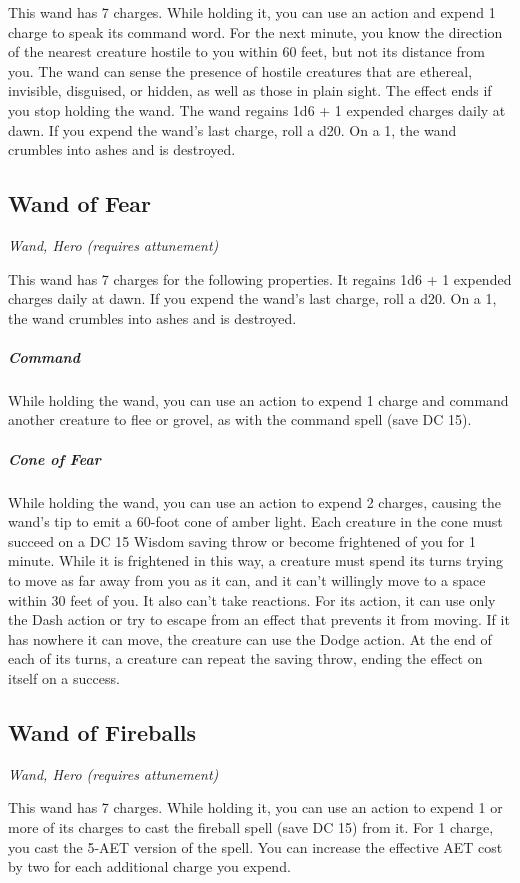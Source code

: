 This wand has 7 charges. While holding it, you can use an action and expend 1 charge to speak its command word. For the next minute, you know the direction of the nearest creature hostile to you within 60 feet,
but not its distance from you. The wand can sense the presence of hostile creatures that are ethereal, invisible, disguised, or hidden, as well as those in plain sight. The effect ends if you stop holding the wand.
The wand regains 1d6 + 1 expended charges daily at dawn. If you expend the wand's last charge, roll a d20. On a 1, the wand crumbles into ashes and is destroyed.

\subsection{Wand of Fear}
\textit{Wand, Hero (requires attunement)}

This wand has 7 charges for the following properties. It regains 1d6 + 1 expended charges daily at dawn. If you expend the wand's last charge, roll a d20. On a 1, the wand crumbles into ashes and is destroyed.

\subparagraph*{Command} While holding the wand, you can use an action to expend 1 charge and command another creature to flee or grovel, as with the command spell (save DC 15).

\subparagraph*{Cone of Fear} While holding the wand, you can use an action to expend 2 charges, causing the wand's tip to emit a 60-foot cone of amber light. Each creature in the cone must succeed on a DC 15 Wisdom saving throw or become frightened of you for 1 minute. While it is frightened in this way, a creature must spend its turns trying to move as far away from you as it can, and it can't willingly move to a space within 30 feet of you. It also can't take reactions. For its action, it can use only the Dash action or try to escape from an effect that prevents it from moving. If it has nowhere it can move, the creature can use the Dodge action. At the end of each of its turns, a creature can repeat the saving throw, ending the effect on itself on a success.

\subsection{Wand of Fireballs}
\textit{Wand, Hero (requires attunement)}

This wand has 7 charges. While holding it, you can use an action to expend 1 or more of its charges to cast the fireball spell (save DC 15) from it. For 1 charge, you cast the 5-AET version of the spell. You can increase the effective AET cost by two for each additional charge you expend.

